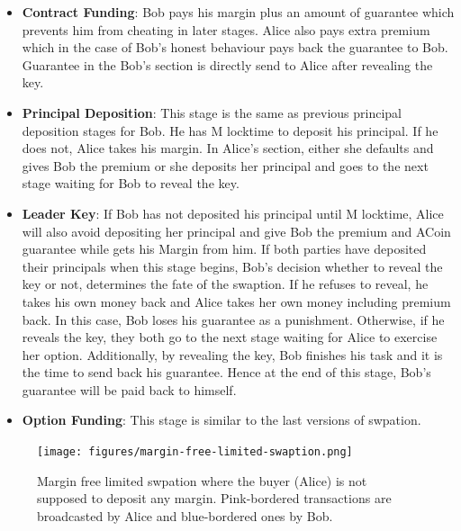 \begin{itemize}
    \item \textbf{Contract Funding}: Bob pays his margin plus an amount of guarantee which prevents him from cheating in later stages. Alice also pays extra premium which in the case of Bob's honest behaviour pays back the guarantee to Bob. Guarantee in the Bob's section is directly send to Alice after revealing the \Aone key. 
    
    \item \textbf{Principal Deposition}: This stage is the same as previous principal deposition stages for Bob. He has M locktime to deposit his principal. If he does not, Alice takes his margin. In Alice's section, either she defaults and gives Bob the premium or she deposits her principal and goes to the next stage waiting for Bob to reveal the \keyone key.
    
    \item \textbf{Leader Key}: If Bob has not deposited his principal until M locktime, Alice will also avoid depositing her principal and give Bob the premium and ACoin guarantee while gets his Margin from him.
    If both parties have deposited their principals when this stage begins, Bob's decision whether to reveal the \keyone key or not, determines the fate of the swaption. If he refuses to reveal, he takes his own money back and Alice takes her own money including premium back. In this case, Bob loses his guarantee as a punishment. Otherwise, if he reveals the \keyone key, they both go to the next stage waiting for Alice to exercise her option. Additionally, by revealing the \keyone key, Bob finishes his task and it is the time to send back his guarantee. Hence at the end of this stage, Bob's guarantee will be paid back to himself.
    
    \item \textbf{Option Funding}: This stage is similar to the last versions of swpation.
\end{itemize}

\begin{figure}
    \centering
    \texttt{[image: figures/margin-free-limited-swaption.png]}
    \caption{Margin free limited swpation where the buyer (Alice) is not supposed to deposit any margin. Pink-bordered transactions are broadcasted by Alice and blue-bordered ones by Bob.}
    \label{fig:swaption-margin-free-limited}
\end{figure}
